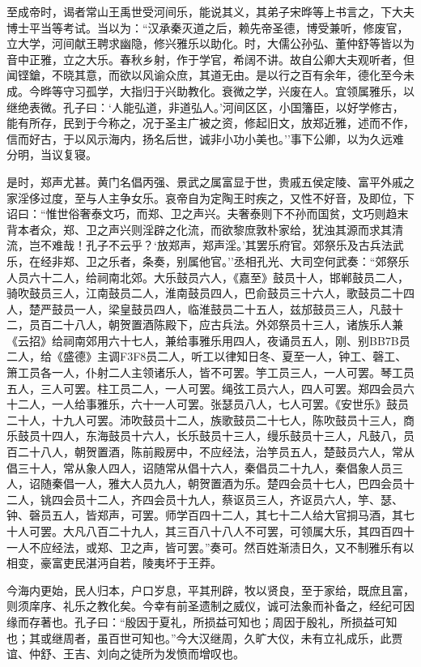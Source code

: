 \documentclass[]{article}
\begin{document}
至成帝时，谒者常山王禹世受河间乐，能说其义，其弟子宋晔等上书言之，下大夫博士平当等考试。当以为：``汉承秦灭道之后，赖先帝圣德，博受兼听，修废官，立大学，河间献王聘求幽隐，修兴雅乐以助化。时，大儒公孙弘、董仲舒等皆以为音中正雅，立之大乐。春秋乡射，作于学官，希阔不讲。故自公卿大夫观听者，但闻铿鎗，不晓其意，而欲以风谕众庶，其道无由。是以行之百有余年，德化至今未成。今晔等守习孤学，大指归于兴助教化。衰微之学，兴废在人。宜领属雅乐，以继绝表微。孔子曰：`人能弘道，非道弘人。'河间区区，小国籓臣，以好学修古，能有所存，民到于今称之，况于圣主广被之资，修起旧文，放郑近雅，述而不作，信而好古，于以风示海内，扬名后世，诚非小功小美也。''事下公卿，以为久远难分明，当议复寝。

是时，郑声尤甚。黄门名倡丙强、景武之属富显于世，贵戚五侯定陵、富平外戚之家淫侈过度，至与人主争女乐。哀帝自为定陶王时疾之，又性不好音，及即位，下诏曰：``惟世俗奢泰文巧，而郑、卫之声兴。夫奢泰则下不孙而国贫，文巧则趋末背本者众，郑、卫之声兴则淫辟之化流，而欲黎庶敦朴家给，犹浊其源而求其清流，岂不难哉！孔子不云乎？`放郑声，郑声淫。'其罢乐府官。郊祭乐及古兵法武乐，在经非郑、卫之乐者，条奏，别属他官。''丞相孔光、大司空何武奏：``郊祭乐人员六十二人，给祠南北郊。大乐鼓员六人，《嘉至》鼓员十人，邯郸鼓员二人，骑吹鼓员三人，江南鼓员二人，淮南鼓员四人，巴俞鼓员三十六人，歌鼓员二十四人，楚严鼓员一人，梁皇鼓员四人，临淮鼓员二十五人，兹邡鼓员三人，凡鼓十二，员百二十八人，朝贺置酒陈殿下，应古兵法。外郊祭员十三人，诸族乐人兼《云招》给祠南郊用六十七人，兼给事雅乐用四人，夜诵员五人，刚、别BB7B员二人，给《盛德》主调F3F8员二人，听工以律知日冬、夏至一人，钟工、磬工、箫工员各一人，仆射二人主领诸乐人，皆不可罢。竽工员三人，一人可罢。琴工员五人，三人可罢。柱工员二人，一人可罢。绳弦工员六人，四人可罢。郑四会员六十二人，一人给事雅乐，六十一人可罢。张瑟员八人，七人可罢。《安世乐》鼓员二十人，十九人可罢。沛吹鼓员十二人，族歌鼓员二十七人，陈吹鼓员十三人，商乐鼓员十四人，东海鼓员十六人，长乐鼓员十三人，缦乐鼓员十三人，凡鼓八，员百二十八人，朝贺置酒，陈前殿房中，不应经法，治竽员五人，楚鼓员六人，常从倡三十人，常从象人四人，诏随常从倡十六人，秦倡员二十九人，秦倡象人员三人，诏随秦倡一人，雅大人员九人，朝贺置酒为乐。楚四会员十七人，巴四会员十二人，铫四会员十二人，齐四会员十九人，蔡讴员三人，齐讴员六人，竽、瑟、钟、磬员五人，皆郑声，可罢。师学百四十二人，其七十二人给大官挏马酒，其七十人可罢。大凡八百二十九人，其三百八十八人不可罢，可领属大乐，其四百四十一人不应经法，或郑、卫之声，皆可罢。''奏可。然百姓渐渍日久，又不制雅乐有以相变，豪富吏民湛沔自若，陵夷坏于王莽。

今海内更始，民人归本，户口岁息，平其刑辟，牧以贤良，至于家给，既庶且富，则须庠序、礼乐之教化矣。今幸有前圣遗制之威仪，诚可法象而补备之，经纪可因缘而存著也。孔子曰：``殷因于夏礼，所损益可知也；周因于殷礼，所损益可知也；其或继周者，虽百世可知也。''今大汉继周，久旷大仪，未有立礼成乐，此贾谊、仲舒、王吉、刘向之徒所为发愤而增叹也。
\end{document}
